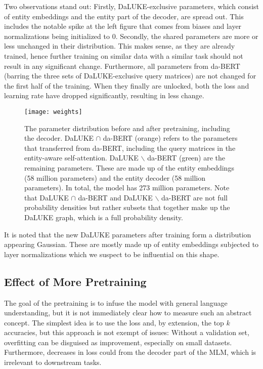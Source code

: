 \documentclass[main.tex]{subfiles}
\begin{document}
Two observations stand out:
Firstly, DaLUKE-exclusive parameters, which consist of entity embeddings and the entity part of the decoder, are spread out.
This includes the notable spike at the left figure that comes from biases and layer normalizations being initialized to 0.
Secondly, the shared parameters are more or less unchanged in their distribution.
This makes sense, as they are already trained, hence further training on similar data with a similar task should not result in any significant change.
Furthermore, all parameters from da-BERT (barring the three sets of DaLUKE-exclusive query matrices) are not changed for the first half of the training.
When they finally are unlocked, both the loss and learning rate have dropped significantly, resulting in less change.
\begin{figure}[H]
    \centering
    \texttt{[image: weights]}
    \caption{
        The parameter distribution before and after pretraining, including the decoder.
        DaLUKE $ \cap $ da-BERT (orange) refers to the parameters that transferred from da-BERT, including the query matrices in the entity-aware self-attention.
        DaLUKE $ \backslash $ da-BERT (green) are the remaining parameters.
        These are made up of the entity embeddings (58 million parameters) and the entity decoder (58 million parameters).
        In total, the model has 273 million parameters.
        Note that DaLUKE $ \cap $ da-BERT and DaLUKE $ \backslash $ da-BERT are not full probability densities but rather subsets that together make up the DaLUKE graph, which is a full probability density.
    }
    \label{fig:weight-dist}
\end{figure}\noindent
It is noted that the new DaLUKE parameters after training form a distribution appearing Gaussian.
These are mostly made up of entity embeddings subjected to layer normalizations which we suspect to be influential on this shape.

\subsection{Effect of More Pretraining}
\label{subsec:effmore}
The goal of the pretraining is to infuse the model with general language understanding, but it is not immediately clear how to measure such an abstract concept.
The simplest idea is to use the loss and, by extension, the top $ k $ accuracies, but this approach is not exempt of issues:
Without a validation set, overfitting can be disguised as improvement, especially on small datasets.
Furthermore, decreases in loss could from the decoder part of the MLM, which is irrelevant to downstream tasks.
\end{document}
